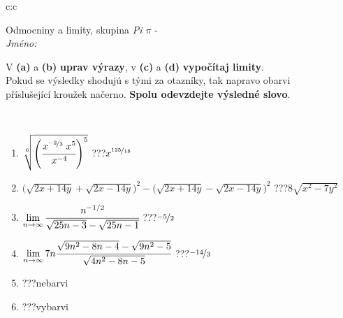 \documentclass[10pt]{report}
\begin{document}
\newpage
\thispagestyle{empty}
\begin{tabular}{c:c}
\begin{minipage}[c][104.5mm][t]{0.5\linewidth}
\begin{center}
\vspace{7mm}
{\huge Odmocniny a limity, skupina \textit{Pi $\pi$} -}\\[5mm]
\textit{Jméno:}\phantom{xxxxxxxxxxxxxxxxxxxxxxxxxxxxxxxxxxxxxxxxxxxxxxxxxxxxxxxxxxxxxxxxx}\\[5mm]
\begin{minipage}{0.95\linewidth}
\begin{center}
V \textbf{(a)} a \textbf{(b)} \textbf{uprav výrazy}, v \textbf{(c)} a \textbf{(d)} \textbf{vypočítaj limity}.\\Pokud se výsledky shodujú s tými za otazníky, tak napravo obarvi\\příslušející kroužek načerno. \textbf{Spolu odevzdejte výsledné slovo}.
\end{center}
\end{minipage}
\\[1mm]
\begin{minipage}{0.79\linewidth}
\begin{center}
\begin{varwidth}{\linewidth}
\begin{enumerate}
\small
\item $\sqrt[6]{\left(\cfrac{x^{\nicefrac{-2}{3}}\;x^{5}}{x^{-4}}\right)^{5}}$\quad \dotfill\; ???\;\dotfill \quad $x^{\nicefrac{125}{18}}$
\item {\footnotesize{\scriptsize$\big(\sqrt{2x+14y}+\sqrt{2x-14y}\big)^2-\big(\sqrt{2x+14y}-\sqrt{2x-14y}\big)^2$}\quad \dotfill\; ???\;\dotfill \quad $8\sqrt{x^2-7y^2}$}
\item $\lim\limits_{n\to\infty}\cfrac{n^{-1/2}}{\sqrt{25n-3}-\sqrt{25n-1}}$\quad \dotfill\; ???\;\dotfill \quad $\nicefrac{-5}{2}$
\item $\lim\limits_{n\to\infty}7n\cfrac{\sqrt{9n^2-8n-4}-\sqrt{9n^2-5}}{\sqrt{4n^2-8n-5}}$\quad \dotfill\; ???\;\dotfill \quad $\nicefrac{-14}{3}$
\item \quad \dotfill\; ???\;\dotfill \quad nebarvi
\item \quad \dotfill\; ???\;\dotfill \quad vybarvi
\end{enumerate}
\end{varwidth}
\end{center}
\end{minipage}
\begin{minipage}{0.20\linewidth}

\end{minipage}
\end{center}
\end{minipage}
\end{tabular}
\end{document}
